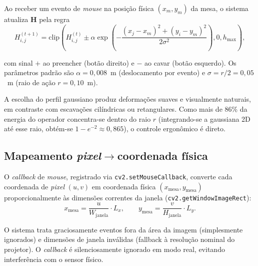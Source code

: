 Ao receber um evento de \emph{mouse} na posição física $(x_m, y_m)$ da
mesa, o sistema atualiza $\mathbf{H}$ pela regra
\begin{equation}
H_{i,j}^{(t+1)} = \text{clip}\!\left(
H_{i,j}^{(t)} \pm \alpha \exp\!\left(
-\frac{(x_j - x_m)^2 + (y_i - y_m)^2}{2\sigma^2}
\right), 0, h_{\max} \right),
\end{equation}

\noindent com sinal $+$ ao preencher (botão direito) e $-$ ao cavar
(botão esquerdo). Os parâmetros padrão são $\alpha = 0{,}008$~m
(deslocamento por evento) e $\sigma = r/2 = 0{,}05$~m (raio de ação
$r = 0{,}10$~m).

A escolha do perfil gaussiano produz deformações suaves e visualmente
naturais, em contraste com escavações cilíndricas ou retangulares. Como
mais de 86\% da energia do operador concentra-se dentro do raio $r$
(integrando-se a gaussiana 2D até esse raio, obtém-se
$1 - e^{-2} \approx 0{,}865$), o controle ergonômico é direto.

\subsection{Mapeamento \textit{pixel}$\to$coordenada física}

O \textit{callback} de \emph{mouse}, registrado via
\texttt{cv2.setMouseCallback}, converte cada coordenada de \emph{pixel}
$(u, v)$ em coordenada física $(x_{\text{mesa}}, y_{\text{mesa}})$
proporcionalmente às dimensões correntes da janela
(\texttt{cv2.getWindowImageRect}):
\begin{equation}
x_{\text{mesa}} = \frac{u}{W_{\text{janela}}} \cdot L_x,
\qquad
y_{\text{mesa}} = \frac{v}{H_{\text{janela}}} \cdot L_y.
\end{equation}

\noindent O sistema trata graciosamente eventos fora da área da imagem
(simplesmente ignorados) e dimensões de janela inválidas (fallback à
resolução nominal do projetor). O \emph{callback} é silenciosamente
ignorado em modo real, evitando interferência com o sensor físico.
